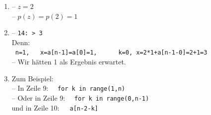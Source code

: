 \begin{enumerate}
	\item -- $z=2$\\
         -- $p(z)=p(2)=1$
	\item -- \texttt{14: > 3}\\
	Denn:\\
	~\hspace*{1cm}\texttt{n=1,~~ x=a[n-1]=a[0]=1,~~~~~ k=0,~x=2*1+a[n-1-0]=2+1=3}\\
	-- Wir hätten 1 als Ergebnis erwartet.
	\item Zum Beispiel:\\
	-- In Zeile 9:~~ \texttt{for k in range(1,n)}\\
	-- Oder in Zeile 9:~~ \texttt{for k in range(0,n-1)}\\
	  \hspace*{0.1cm} und in Zeile 10:~~~\texttt{a[n-2-k]}
\end{enumerate}